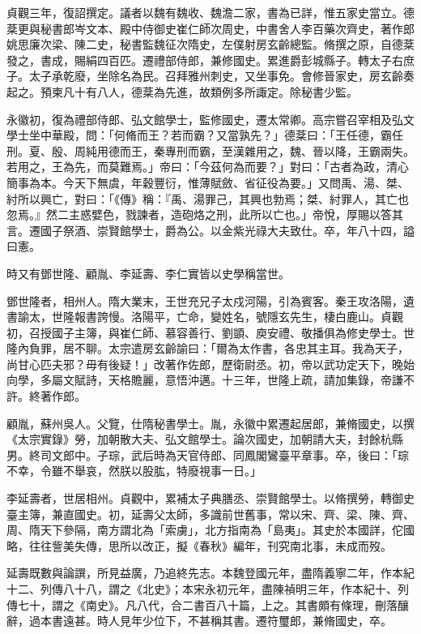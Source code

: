 \begin{pinyinscope}
 貞觀三年，復詔撰定。議者以魏有魏收、魏澹二家，書為已詳，惟五家史當立。德棻更與秘書郎岑文本、殿中侍御史崔仁師次周史，中書舍人李百藥次齊史，著作郎姚思廉次梁、陳二史，秘書監魏征次隋史，左僕射房玄齡總監。脩撰之原，自德棻發之，書成，賜絹四百匹。遷禮部侍郎，兼修國史。累進爵彭城縣子。轉太子右庶子。太子承乾廢，坐除名為民。召拜雅州刺史，又坐事免。會修晉家史，房玄齡奏起之。預柬凡十有八人，德棻為先進，故類例多所諏定。除秘書少監。



 永徽初，復為禮部侍郎、弘文館學士，監修國史，遷太常卿。高宗嘗召宰相及弘文學士坐中華殿，問：「何脩而王？若而霸？又當孰先？」德棻曰：「王任德，霸任刑。夏、殷、周純用德而王，秦專刑而霸，至漢雜用之，魏、晉以降，王霸兩失。若用之，王為先，而莫難焉。」帝曰：「今茲何為而要？」對曰：「古者為政，清心簡事為本。今天下無虞，年穀豐衍，惟薄賦斂、省征役為要。」又問禹、湯、桀、紂所以興亡，對曰：「《傳》稱：『禹、湯罪己，其興也勃焉；桀、紂罪人，其亡也忽焉。』然二主惑嬖色，戮諫者，造砲烙之刑，此所以亡也。」帝悅，厚賜以答其言。遷國子祭酒、崇賢館學士，爵為公。以金紫光祿大夫致仕。卒，年八十四，謚曰憲。



 時又有鄧世隆、顧胤、李延壽、李仁實皆以史學稱當世。



 鄧世隆者，相州人。隋大業末，王世充兄子太戍河陽，引為賓客。秦王攻洛陽，遺書諭太，世隆報書誇慢。洛陽平，亡命，變姓名，號隱玄先生，棲白鹿山。貞觀初，召授國子主簿，與崔仁師、慕容善行、劉顗、庾安禮、敬播俱為修史學士。世隆內負罪，居不聊。太宗遣房玄齡諭曰：「爾為太作書，各忠其主耳。我為天子，尚甘心匹夫邪？毋有後疑！」改著作佐郎，歷衛尉丞。初，帝以武功定天下，晚始向學，多屬文賦詩，天格贍麗，意悟沖邁。十三年，世隆上疏，請加集錄，帝謙不許。終著作郎。



 顧胤，蘇州吳人。父覽，仕隋秘書學士。胤，永徽中累遷起居郎，兼脩國史，以撰《太宗實錄》勞，加朝散大夫、弘文館學士。論次國史，加朝請大夫，封餘杭縣男。終司文郎中。子琮，武后時為天官侍郎、同鳳閣鸞臺平章事。卒，後曰：「琮不幸，令雖不舉哀，然朕以股肱，特廢視事一日。」



 李延壽者，世居相州。貞觀中，累補太子典膳丞、崇賢館學士。以脩撰勞，轉御史臺主簿，兼直國史。初，延壽父太師，多識前世舊事，常以宋、齊、梁、陳、齊、周、隋天下參隔，南方謂北為「索虜」，北方指南為「島夷」。其史於本國詳，佗國略，往往訾美失傳，思所以改正，擬《春秋》編年，刊究南北事，未成而歿。



 延壽既數與論譔，所見益廣，乃追終先志。本魏登國元年，盡隋義寧二年，作本紀十二、列傳八十八，謂之《北史》；本宋永初元年，盡陳禎明三年，作本紀十、列傳七十，謂之《南史》。凡八代，合二書百八十篇，上之。其書頗有條理，刪落釀辭，過本書遠甚。時人見年少位下，不甚稱其書。遷符璽郎，兼脩國史，卒。




\end{pinyinscope}
